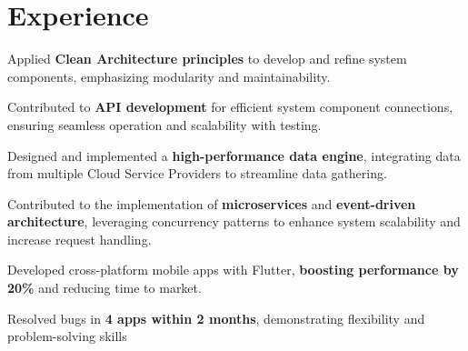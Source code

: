 \documentclass[]{deedy-resume-reversed}
\begin{document}
\begin{minipage}[t]{0.60\textwidth}


\section{Experience}
\vspace{\topsep} %
\begin{justify}
\begin{tightemize}
\item Applied \textbf{Clean Architecture principles} to develop and refine system components, emphasizing modularity and maintainability.
\item  Contributed to \textbf{API development} for efficient system component connections, ensuring seamless operation and scalability with testing.
\end{tightemize}
\end{justify}
\sectionsep

\begin{justify}
\begin{tightemize}
\item Designed and implemented a \textbf{high-performance data engine}, integrating data from multiple Cloud Service Providers to streamline data gathering.
\item Contributed to the implementation of \textbf{microservices} and \textbf{event-driven architecture}, leveraging concurrency patterns to enhance system scalability and increase request handling.

\end{tightemize}
\end{justify}
\sectionsep

\begin{justify}
\begin{tightemize}
\item Developed cross-platform mobile apps with Flutter, \textbf{boosting performance by 20\%} and reducing time to market.
\item Resolved bugs in \textbf{4 apps within 2 months}, demonstrating flexibility and problem-solving skills
\end{tightemize}
\end{justify}
\sectionsep


\end{minipage}
\end{document}
